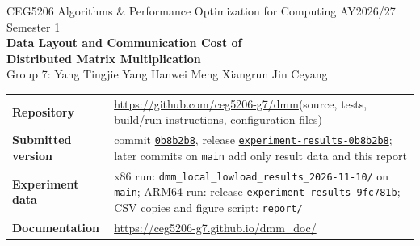\documentclass[11pt,a4paper]{article}
\newcommand{\code}[1]{\texttt{#1}}
\newcommand{\repo}{\url{https://github.com/ceg5206-g7/dmm}}
\begin{document}
\thispagestyle{plain}
\begin{center}
  {\small\color{gray}CEG5206 Algorithms \& Performance Optimization for Computing \textperiodcentered{} AY2026/27 Semester 1}\\[0.9ex]
  {\LARGE\bfseries\color{accent} Data Layout and Communication Cost of\\[0.3ex] Distributed Matrix Multiplication}\\[1.4ex]
  {\large Group 7: Yang Tingjie \quad Yang Hanwei \quad Meng Xiangrun \quad Jin Ceyang}
\end{center}

\vspace{0.4ex}
\noindent
\begin{tabularx}{\textwidth}{@{}>{\bfseries\small}l>{\small\raggedright\arraybackslash}X@{}}
\toprule
Repository      & \repo \quad(source, tests, build/run instructions, configuration files) \\
Submitted version & commit \href{https://github.com/ceg5206-g7/dmm/commit/0b8b2b8df622842b03d3e398593a7c3504770e75}{\code{0b8b2b8}}, release \href{https://github.com/ceg5206-g7/dmm/releases/tag/experiment-results-0b8b2b8}{\code{experiment-results-0b8b2b8}}; later commits on \code{main} add only result data and this report \\
Experiment data & x86 run: \code{dmm\_local\_lowload\_results\_2026-11-10/} on \code{main}; ARM64 run: release \href{https://github.com/ceg5206-g7/dmm/releases/tag/experiment-results-9fc781b}{\code{experiment-results-9fc781b}}; CSV copies and figure script: \code{report/} \\
Documentation   & \url{https://ceg5206-g7.github.io/dmm_doc/} \\
\bottomrule
\end{tabularx}
\end{document}
